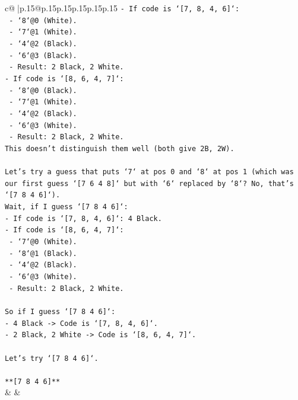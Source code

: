 \documentclass{article}
\begin{document}
{\begin{supertabular}{c@{$\;$}|p{.15\linewidth}@{}p{.15\linewidth}p{.15\linewidth}p{.15\linewidth}p{.15\linewidth}p{.15\linewidth}}
{{{\texttt{{-} If code is `{[}7, 8, 4, 6{]}`:} \\
\texttt{    {-} `8`@0 (White).} \\
\texttt{    {-} `7`@1 (White).} \\
\texttt{    {-} `4`@2 (Black).} \\
\texttt{    {-} `6`@3 (Black).} \\
\texttt{    {-} Result: 2 Black, 2 White.} \\
\texttt{{-} If code is `{[}8, 6, 4, 7{]}`:} \\
\texttt{    {-} `8`@0 (Black).} \\
\texttt{    {-} `7`@1 (White).} \\
\texttt{    {-} `4`@2 (Black).} \\
\texttt{    {-} `6`@3 (White).} \\
\texttt{    {-} Result: 2 Black, 2 White.} \\
\texttt{This doesn't distinguish them well (both give 2B, 2W).} \\
\\ 
\texttt{Let's try a guess that puts `7` at pos 0 and `8` at pos 1 (which was our first guess `{[}7 6 4 8{]}` but with `6` replaced by `8`? No, that's `{[}7 8 4 6{]}`).} \\
\texttt{Wait, if I guess `{[}7 8 4 6{]}`:} \\
\texttt{{-} If code is `{[}7, 8, 4, 6{]}`: 4 Black.} \\
\texttt{{-} If code is `{[}8, 6, 4, 7{]}`:} \\
\texttt{    {-} `7`@0 (White).} \\
\texttt{    {-} `8`@1 (Black).} \\
\texttt{    {-} `4`@2 (Black).} \\
\texttt{    {-} `6`@3 (White).} \\
\texttt{    {-} Result: 2 Black, 2 White.} \\
\\ 
\texttt{So if I guess `{[}7 8 4 6{]}`:} \\
\texttt{{-} 4 Black {-}> Code is `{[}7, 8, 4, 6{]}`.} \\
\texttt{{-} 2 Black, 2 White {-}> Code is `{[}8, 6, 4, 7{]}`.} \\
\\ 
\texttt{Let's try `{[}7 8 4 6{]}`.} \\
\\ 
\texttt{**{[}7 8 4 6{]}**} \\
            }
        }
    }
    & & \\ \\


\end{supertabular}}
\end{document}
